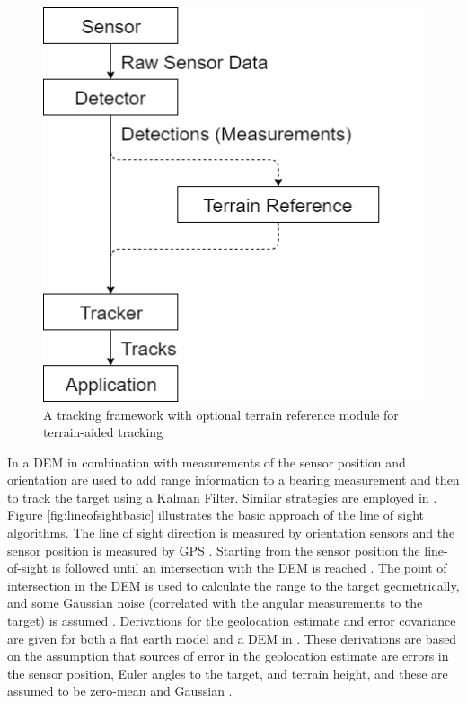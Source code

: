 \documentclass[journal]{IEEEtran}
\begin{document}
\begin{figure}[ht]
    \centering
    \includegraphics[scale=0.4]{TrackingFlowcharts.png}
    \caption{A tracking framework with optional terrain reference module for terrain-aided tracking}
    \label{fig:trackingflowcharts}
\end{figure}

In \cite{collins1989terrain} a DEM in combination with measurements of the sensor position and orientation are used to add range information to a bearing measurement and then to track the target using a Kalman Filter. Similar strategies are employed in \cite{collins1998using, kim2015utilization, kim2009terrain, mallick2007geolocation, wolfe2002achieving, davison1999mobile, collins2000system, xu2019target, tufan2012emitter}. Figure \ref{fig:lineofsightbasic} illustrates the basic approach of the line of sight algorithms. The line of sight direction is measured by orientation sensors and the sensor position is measured by GPS \cite{collins1989terrain}. Starting from the sensor position the line-of-sight is followed until an intersection with the DEM is reached \cite{collins1989terrain}. The point of intersection in the DEM is used to calculate the range to the target geometrically, and some Gaussian noise (correlated with the angular measurements to the target) is assumed \cite{collins1989terrain}. Derivations for the geolocation estimate and error covariance are given for both a flat earth model and a DEM in \cite{mallick2007geolocation}. These derivations are based on the assumption that sources of error in the geolocation estimate are errors in the sensor position, Euler angles to the target, and terrain height, and these are assumed to be zero-mean and Gaussian \cite{mallick2007geolocation}. 
\end{document}
